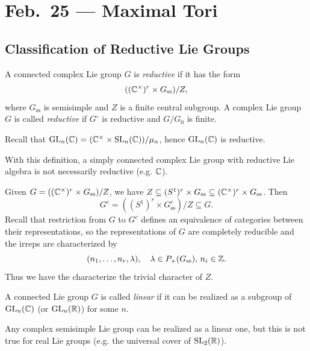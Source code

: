 \chapter{Feb.~25 --- Maximal Tori}

\section{Classification of Reductive Lie Groups}

\begin{definition}
  A connected complex Lie group $G$ is
  \emph{reductive} if it has the form
  \[
    ((\mathbb{C}^\times)^r \times G_{\mathrm{ss}}) / Z,
  \]
  where $G_{\mathrm{ss}}$ is semisimple and
  $Z$ is a finite central subgroup.
  A complex Lie group $G$ is called
  \emph{reductive} if $G^\circ$ is reductive
  and $G / G_0$ is finite.
\end{definition}

\begin{example}
  Recall that
  $\operatorname{GL}_n(\mathbb{C})
    = (\mathbb{C}^\times \times \operatorname{SL}_n(\mathbb{C})) / \mu_n$,
  hence $\operatorname{GL}_n(\mathbb{C})$ is reductive.
\end{example}

\begin{remark}
  With this definition, a simply connected
  complex Lie group with reductive
  Lie algebra is not necessarily reductive
  (e.g. $\mathbb{C}$).
\end{remark}

\begin{remark}
  Given $G = ((\mathbb{C}^\times)^r \times G_{\mathrm{ss}}) / Z$,
  we have $Z \subseteq (S^1)^r \times G_{\mathrm{ss}} \subseteq (\mathbb{C}^\times)^r \times G_{\mathrm{ss}}$.
  Then
  \[
    G^c = ((S^1)^r \times G_{\mathrm{ss}}^c) / Z \subseteq G.
  \]
  Recall that restriction from $G$ to $G^c$
  defines an equivalence of categories between their
  representations, so the representations
  of $G$ are completely reducible and
  the irreps are characterized by
  \[
    (n_1, \dots, n_r, \lambda), \quad
    \lambda \in P_+(G_{\mathrm{ss}}),\, n_i \in \mathbb{Z}.
  \]
  Thus we have the characterize the
  trivial character of $Z$.
\end{remark}

\begin{definition}
  A connected Lie group $G$ is called
  \emph{linear} if it can be realized as
  a subgroup of $\operatorname{GL}_n(\mathbb{C})$ (or $\operatorname{GL}_n(\mathbb{R})$)
  for some $n$.
\end{definition}

\begin{remark}
  Any complex semisimple Lie group
  can be realized as a linear one, but
  this is not true for real Lie groups
  (e.g. the universal cover of $\operatorname{SL}_2(\mathbb{R})$).
\end{remark}

